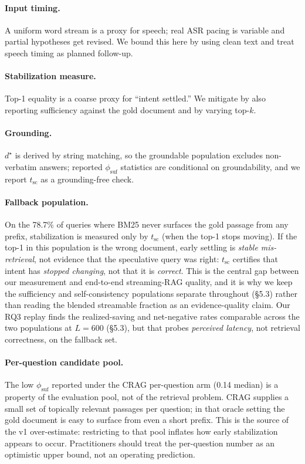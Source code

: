 \documentclass[11pt]{article}
\newcommand{\nFallbackPct}{78.7\%}    %
\newcommand{\phiSufMed}{0.14}
\begin{document}
\paragraph{Input timing.} A uniform word stream is a proxy for speech; real ASR
pacing is variable and partial hypotheses get revised. We bound this here by using
clean text and treat speech timing as planned follow-up.
\paragraph{Stabilization measure.} Top-1 equality is a coarse proxy for ``intent
settled.'' We mitigate by also reporting sufficiency against the gold document and
by varying top-$k$.
\paragraph{Grounding.} $d^\star$ is derived by string matching, so the groundable
population excludes non-verbatim answers; reported $\phi_{\mathrm{suf}}$ statistics
are conditional on groundability, and we report $t_{\mathrm{sc}}$ as a
grounding-free check.
\paragraph{Fallback population.} On the \nFallbackPct{} of queries where BM25 never
surfaces the gold passage from any prefix, stabilization is measured only by
$t_{\mathrm{sc}}$ (when the top-1 stops moving). If the top-1 in this population is
the wrong document, early settling is \emph{stable mis-retrieval}, not evidence that
the speculative query was right: $t_{\mathrm{sc}}$ certifies that intent has
\emph{stopped changing}, not that it is \emph{correct}. This is the central gap
between our measurement and end-to-end streaming-RAG quality, and it is why we keep
the sufficiency and self-consistency populations separate throughout (\S5.3) rather
than reading the blended streamable fraction as an evidence-quality claim. Our RQ3
replay finds the realized-saving and net-negative rates comparable across the two
populations at $L{=}600$ (\S5.3), but that probes \emph{perceived latency}, not
retrieval correctness, on the fallback set.

\paragraph{Per-question candidate pool.} The low $\phi_{\mathrm{suf}}$ reported
under the CRAG per-question arm (\phiSufMed{} median) is a property of the
evaluation pool, not of the retrieval problem.  CRAG supplies a small set of
topically relevant passages per question; in that oracle setting the gold
document is easy to surface from even a short prefix.  This is the source of the
v1 over-estimate: restricting to that pool inflates how early stabilization
appears to occur.  Practitioners should treat the per-question number as an
optimistic upper bound, not an operating prediction.
\end{document}
